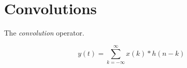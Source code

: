 \section{Convolutions}\label{sec:Convolutions}
\begin{definition}[Convolution]\label{def:Convolution}
  The \emph{convolution} operator.

  \begin{equation}\label{eq:Convolution}
    y(t) = \sum\limits_{k=-\infty}^{\infty} x(k) * h(n-k)
  \end{equation}
\end{definition}

